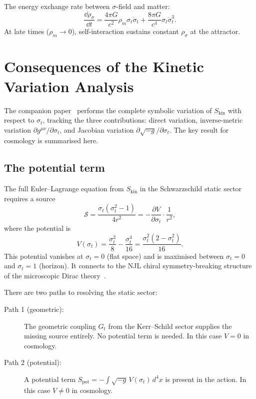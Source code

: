 \documentclass[11pt,a4paper]{article}
\theoremstyle{plain}
\theoremstyle{definition}
\theoremstyle{remark}
\newcommand{\dotv}{\dot\sigma_t}
\begin{document}
The energy exchange rate between $\sigma$-field and matter:
\begin{equation}
  \frac{\dd\rho_\sigma}{\dd t}
  = \frac{4\pi G}{c^2}\rho_m\sigma_t\dotv
  + \frac{8\pi G}{c^4}\sigma_t\dotv^3.
\end{equation}
At late times ($\rho_m \to 0$), self-interaction sustains constant
$\rho_\sigma$ at the attractor.

\section{Consequences of the Kinetic Variation Analysis}
\label{sec:kin_consequences}

The companion paper~\cite{matshaba2026:kin_var} performs the complete
symbolic variation of $S_{\mathrm{kin}}$ with respect to $\sigma_t$,
tracking the three contributions: direct variation, inverse-metric
variation $\partial g^{\mu\nu}/\partial\sigma_t$, and Jacobian variation
$\partial\sqrt{-g}/\partial\sigma_t$.  The key result for cosmology is
summarised here.

\subsection{The potential term}
\label{sec:potential}

The full Euler--Lagrange equation from $S_{\mathrm{kin}}$ in the
Schwarzschild static sector requires a source
\begin{equation}
  \mathcal{S} = \frac{\sigma_t(\sigma_t^2 - 1)}{4r^2}
  = -\frac{\partial V}{\partial\sigma_t}\cdot\frac{1}{r^2},
\end{equation}
where the potential is
\begin{equation}
  \boxed{V(\sigma_t) = \frac{\sigma_t^2}{8} - \frac{\sigma_t^4}{16}
  = \frac{\sigma_t^2(2-\sigma_t^2)}{16}.}
  \label{eq:potential}
\end{equation}
This potential vanishes at $\sigma_t = 0$ (flat space) and is
maximised between $\sigma_t = 0$ and $\sigma_t = 1$ (horizon).  It
connects to the NJL chiral symmetry-breaking structure of the
microscopic Dirac theory~\cite{matshaba2026:kin}.

There are two paths to resolving the static sector:

\begin{description}
  \item[Path 1 (geometric):] The geometric coupling $G_t$ from the
    Kerr--Schild sector supplies the missing source entirely.
    No potential term is needed.  In this case $V = 0$ in cosmology.

  \item[Path 2 (potential):] A potential term $S_{\mathrm{pot}} =
    -\int\sqrt{-g}\,V(\sigma_t)\,d^4x$ is present in the action.
    In this case $V \neq 0$ in cosmology.
\end{description}
\end{document}
